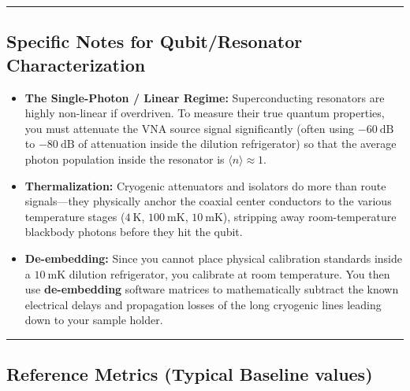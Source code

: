 \documentclass[
]{article}
\providecommand{\tightlist}{%
  \setlength{\itemsep}{0pt}\setlength{\parskip}{0pt}}
\begin{document}
\begin{center}\rule{0.5\linewidth}{0.5pt}\end{center}

\subsection{Specific Notes for Qubit/Resonator
Characterization}\label{specific-notes-for-qubitresonator-characterization}

\begin{itemize}
\tightlist
\item
  \textbf{The Single-Photon / Linear Regime:} Superconducting resonators
  are highly non-linear if overdriven. To measure their true quantum
  properties, you must attenuate the VNA source signal significantly
  (often using \(-60\ \text{dB}\) to \(-80\ \text{dB}\) of attenuation
  inside the dilution refrigerator) so that the average photon
  population inside the resonator is \(\langle n \rangle \approx 1\).
\item
  \textbf{Thermalization:} Cryogenic attenuators and isolators do more
  than route signals---they physically anchor the coaxial center
  conductors to the various temperature stages (\(4\ \text{K}\),
  \(100\ \text{mK}\), \(10\ \text{mK}\)), stripping away
  room-temperature blackbody photons before they hit the qubit.
\item
  \textbf{De-embedding:} Since you cannot place physical calibration
  standards inside a \(10\ \text{mK}\) dilution refrigerator, you
  calibrate at room temperature. You then use \textbf{de-embedding}
  software matrices to mathematically subtract the known electrical
  delays and propagation losses of the long cryogenic lines leading down
  to your sample holder.
\end{itemize}

\begin{center}\rule{0.5\linewidth}{0.5pt}\end{center}

\subsection{Reference Metrics (Typical Baseline
values)}\label{reference-metrics-typical-baseline-values}
\end{document}
